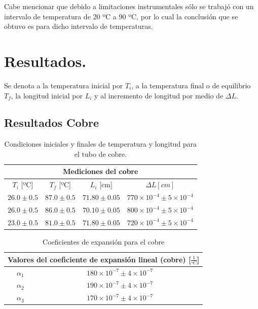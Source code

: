 \documentclass[a4paper]{article}
\begin{document}
Cabe mencionar que debido a limitaciones instrumentales sólo se trabajó con un intervalo de temperatura de 20 ºC a 90 ºC, por lo cual la conclusión que se obtuvo es para dicho intervalo de temperaturas.

\section*{Resultados.}
Se denota a la temperatura inicial por $T_i$, a la temperatura final o de equilibrio $T_f$, la longitud inicial por $L_i$ y al incremento de longitud por medio de $\Delta L$.

\subsection*{Resultados Cobre}
\begin{table}[H]
    \centering
    \begin{tabular}{|c|c|c|c|}\hline
    \multicolumn{4}{|c|}{\textbf{Mediciones del cobre}} \\ \hline
     $T_{i}$ [ºC] & $T_{f}$ [ºC] & $L_{i}$ [cm] & $\Delta L [cm]$\\ \hline
     $26.0\pm0.5$ & $87.0\pm0.5$ & $71.80\pm0.05$ & $770\times10^{-4}\pm5\times10^{-4}$\\ \hline
     $26.0\pm0.5$ & $86.0\pm0.5$ & $70.10\pm0.05$ & $800\times10^{-4}\pm5\times10^{-4}$\\ \hline
     $23.0\pm0.5$ & $81.0\pm0.5$ & $71.80\pm0.05$ & $720\times10^{-4}\pm5\times10^{-4}$\\ \hline
\end{tabular}
    \caption{Condiciones iniciales y finales de temperatura y longitud para el tubo de cobre.}
    \label{Tabla 1}
\end{table}

\begin{table}[H]
    \centering
    \begin{tabular}{|c|c|} \hline
    \multicolumn{2}{|c|}{Valores del coeficiente de expansión lineal (cobre) [$\frac{1}{^{\circ}C}$]} \\ \hline
         $\alpha_{1}$ & $180\times 10^{-7}\pm 4\times10^{-7}$ \\ \hline
         $\alpha_{2}$ & $190 \times 10^{-7}\pm 4\times10^{-7}$ \\ \hline
         $\alpha_{3}$ & $170 \times 10^{-7}\pm 4\times10^{-7}$ \\ \hline
    \end{tabular}
    \caption{Coeficientes de expansión para el cobre}
    \label{Tabla 1.1}
\end{table}
\end{document}

